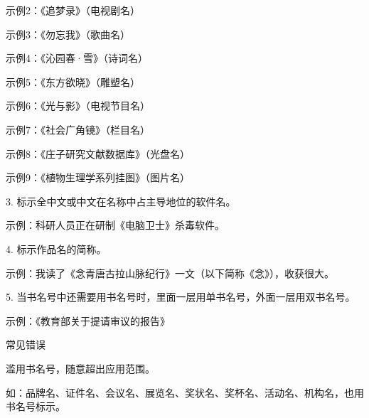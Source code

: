 示例2：《追梦录》（电视剧名）

示例3：《勿忘我》（歌曲名）

示例4：《沁园春·雪》（诗词名）

示例5：《东方欲晓》（雕塑名）

示例6：《光与影》（电视节目名）

示例7：《社会广角镜》（栏目名）

示例8：《庄子研究文献数据库》（光盘名）

示例9：《植物生理学系列挂图》（图片名）

3. 标示全中文或中文在名称中占主导地位的软件名。

示例：科研人员正在研制《电脑卫士》杀毒软件。

4. 标示作品名的简称。

示例：我读了《念青唐古拉山脉纪行》一文（以下简称《念》），收获很大。

5. 当书名号中还需要用书名号时，里面一层用单书名号，外面一层用双书名号。

示例：《教育部关于提请审议的报告》

常见错误

滥用书名号，随意超出应用范围。

如：品牌名、证件名、会议名、展览名、奖状名、奖杯名、活动名、机构名，也用书名号标示。


